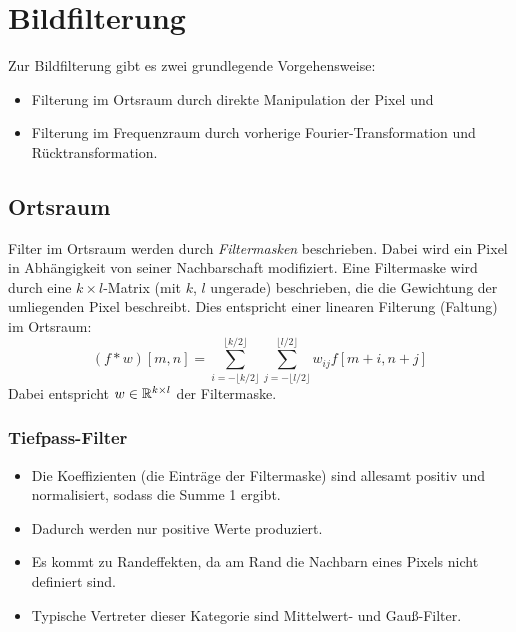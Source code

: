 \section{Bildfilterung}
Zur Bildfilterung gibt es zwei grundlegende Vorgehensweise:
\begin{itemize}
	\item Filterung im Ortsraum durch direkte Manipulation der Pixel und
	\item Filterung im Frequenzraum durch vorherige Fourier-Transformation und Rücktransformation.
\end{itemize}

\subsection{Ortsraum}
Filter im Ortsraum werden durch \emph{Filtermasken} beschrieben. Dabei wird ein Pixel in Abhängigkeit von seiner Nachbarschaft modifiziert. Eine Filtermaske wird durch eine \( k \times l \)-Matrix (mit \(k\), \(l\) ungerade) beschrieben, die die Gewichtung der umliegenden Pixel beschreibt. Dies entspricht einer linearen Filterung (Faltung) im Ortsraum:
\begin{equation*}
	(f \ast w)[m, n] = \sum_{i = -\lfloor k/2 \rfloor}^{\lfloor k/2 \rfloor} \sum_{j = -\lfloor l/2 \rfloor}^{\lfloor l/2 \rfloor} w_{ij} f[m + i, n + j]
\end{equation*}
Dabei entspricht \( w \in \mathbb{R}^{k \times l} \) der Filtermaske.

\subsubsection{Tiefpass-Filter}
	\begin{itemize}
		\item Die Koeffizienten (\dh die Einträge der Filtermaske) sind allesamt positiv und normalisiert, sodass die Summe \num{1} ergibt.
		\item Dadurch werden nur positive Werte produziert.
		\item Es kommt zu Randeffekten, da am Rand die Nachbarn eines Pixels nicht definiert sind.
		\item Typische Vertreter dieser Kategorie sind Mittelwert- und Gauß-Filter.
	\end{itemize}

